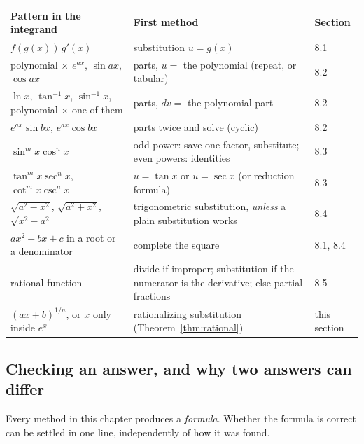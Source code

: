 \documentclass[11pt]{article}
\begin{document}
\begin{center}
\renewcommand{\arraystretch}{1.3}
\begin{tabular}{p{2.3in}p{2.75in}l}
\textbf{Pattern in the integrand} & \textbf{First method} & \textbf{Section}\\ \hline
$f(g(x))\,g'(x)$ & substitution $u=g(x)$ & 8.1\\
polynomial $\times$ $e^{ax}$, $\sin ax$, $\cos ax$ & parts, $u=$ the polynomial (repeat, or tabular) & 8.2\\
$\ln x$, $\tan^{-1}x$, $\sin^{-1}x$, polynomial $\times$ one of them & parts, $dv=$ the polynomial part & 8.2\\
$e^{ax}\sin bx$, $e^{ax}\cos bx$ & parts twice and solve (cyclic) & 8.2\\
$\sin^mx\cos^nx$ & odd power: save one factor, substitute; even powers: identities & 8.3\\
$\tan^mx\sec^nx$, $\cot^mx\csc^nx$ & $u=\tan x$ or $u=\sec x$ (or reduction formula) & 8.3\\
$\sqrt{a^2-x^2}$, $\sqrt{a^2+x^2}$, $\sqrt{x^2-a^2}$ & trigonometric substitution, \emph{unless} a plain substitution works & 8.4\\
$ax^2+bx+c$ in a root or a denominator & complete the square & 8.1, 8.4\\
rational function & divide if improper; substitution if the numerator is the derivative; else partial fractions & 8.5\\
$(ax+b)^{1/n}$, or $x$ only inside $e^x$ & rationalizing substitution (Theorem~\ref{thm:rational}) & this section\\
\end{tabular}
\end{center}

\subsection*{Checking an answer, and why two answers can differ}

Every method in this chapter produces a \emph{formula}. Whether the formula is correct can be settled in one line, independently of how it was found.
\end{document}

